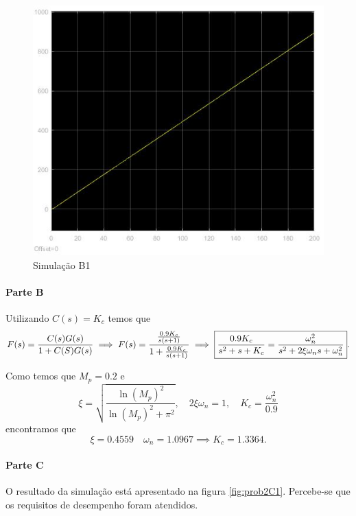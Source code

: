 \documentclass[
]{book}
\theoremstyle{definition}
\theoremstyle{definition}
\theoremstyle{definition}
\theoremstyle{remark}
\begin{document}
\begin{figure}

{\centering \includegraphics[width=0.8\linewidth]{Imagens/Lab5/Resolução/prob2A1} 

}

\caption{Simulação B1}\label{fig:prob2A1}
\end{figure}

\hypertarget{parte-b-1}{%
\paragraph*{Parte B}\label{parte-b-1}}

Utilizando \(C(s) = K_c\) temos que
\[
F(s) = \frac{C(s)G(s)}{1+C(S)G(s)} \implies F(s) = \frac{\frac{0.9K_c}{s(s+1)}}{1+\frac{0.9K_c}{s(s+1)}} \\
\implies \boxed{\frac{0.9K_c}{s^2+s+K_c} = \frac{\omega_n^2}{s^2+2\xi\omega_ns+\omega_n^2}}.
\]

Como temos que \(M_p = 0.2\) e
\[
\xi = \sqrt{\frac{\ln{(M_p)}^2}{\ln{(M_p)}^2+\pi^2}}, \quad 2\xi\omega_n=1, \quad K_c=\frac{\omega_n^2}{0.9}
\]
encontramos que
\[
\xi = 0.4559\quad \omega_n = 1.0967 \implies \boxed{K_c = 1.3364}. 
\]

\hypertarget{parte-c-1}{%
\paragraph*{Parte C}\label{parte-c-1}}

O resultado da simulação está apresentado na figura \ref{fig:prob2C1}. Percebe-se que os requisitos de desempenho foram atendidos.
\end{document}
